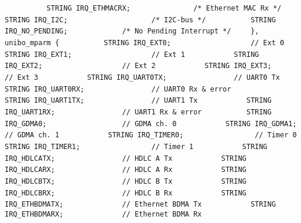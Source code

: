 {{{{\lstinline!          STRING IRQ_ETHMACRX;               /* Ethernet MAC Rx */! \newline
\lstinline!          STRING IRQ_I2C;                    /* I2C-bus */! \newline
\lstinline!          STRING IRQ_NO_PENDING;             /* No Pending Interrupt */! \newline
\lstinline!	   },! \newline
\lstinline!        unibo_mparm {! \newline
\lstinline!          STRING IRQ_EXT0;                   // Ext 0 ! \newline
\lstinline!          STRING IRQ_EXT1;                   // Ext 1 ! \newline
\lstinline!          STRING IRQ_EXT2;                   // Ext 2 ! \newline
\lstinline!          STRING IRQ_EXT3;                   // Ext 3 ! \newline
\lstinline!          STRING IRQ_UART0TX;                // UART0 Tx ! \newline
\lstinline!          STRING IRQ_UART0RX;                // UART0 Rx & error! \newline
\lstinline!          STRING IRQ_UART1TX;                // UART1 Tx ! \newline
\lstinline!          STRING IRQ_UART1RX;                // UART1 Rx & error! \newline
\lstinline!          STRING IRQ_GDMA0;                  // GDMA ch. 0 ! \newline
\lstinline!          STRING IRQ_GDMA1;                  // GDMA ch. 1 ! \newline
\lstinline!          STRING IRQ_TIMER0;                 // Timer 0 ! \newline
\lstinline!          STRING IRQ_TIMER1;                 // Timer 1 ! \newline
\lstinline!          STRING IRQ_HDLCATX;                // HDLC A Tx ! \newline
\lstinline!          STRING IRQ_HDLCARX;                // HDLC A Rx ! \newline
\lstinline!          STRING IRQ_HDLCBTX;                // HDLC B Tx ! \newline
\lstinline!          STRING IRQ_HDLCBRX;                // HDLC B Rx ! \newline
\lstinline!          STRING IRQ_ETHBDMATX;              // Ethernet BDMA Tx ! \newline
\lstinline!          STRING IRQ_ETHBDMARX;              // Ethernet BDMA Rx ! \newline
}}}}
